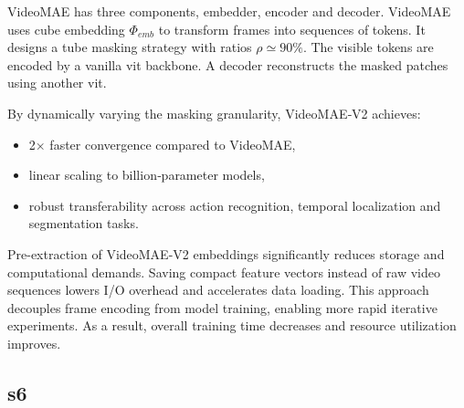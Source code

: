 VideoMAE has three components, embedder, encoder and decoder. VideoMAE uses cube embedding \(\Phi_{emb}\) to transform frames into sequences of tokens. It designs a tube masking strategy with ratios \(\rho \simeq 90\%\). The visible tokens are encoded by a vanilla \acrshort{vit} backbone. A decoder reconstructs the masked patches using another \acrshort{vit}\cite{wang_videomae_2023}. 

By dynamically varying the masking granularity, VideoMAE‑V2 achieves:
\begin{itemize}
    \item 2× faster convergence compared to VideoMAE,
    \item linear scaling to billion‑parameter models,
    \item robust transferability across action recognition, temporal localization and segmentation tasks\cite{wang_videomae_2023}.
\end{itemize}

Pre-extraction of VideoMAE-V2 embeddings significantly reduces storage and computational demands. Saving compact feature vectors instead of raw video sequences lowers I/O overhead and accelerates data loading. This approach decouples frame encoding from model training, enabling more rapid iterative experiments. As a result, overall training time decreases and resource utilization improves. 

\subsection{\acrfull{s6}}
\label{ssec:s6}

